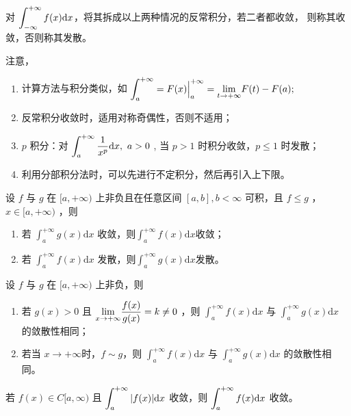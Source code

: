 对 $ \displaystyle \int_{-\infty}^{+\infty}f(x)\mathrm{d}x $，将其拆成以上两种情况的反常积分，若二者都收敛，
则称其收敛，否则称其发散。

注意，
\begin{enumerate}
    \item 计算方法与积分类似，如 $\displaystyle \int_a^{+\infty} = F(x)\Big|^{+\infty}_a = 
    {\displaystyle\lim_{t\rightarrow +\infty}}F(t) - F(a); $ 
    \item 反常积分收敛时，适用对称奇偶性，否则不适用；
    \item $ p $ 积分：对 $ \displaystyle \int_a^{+\infty}\dfrac{1}{x^p}\mathrm{d}x,\ a>0 $ ,
    当 $ p > 1 $ 时积分收敛，$ p\leq 1 $ 时发散；
    \item 利用分部积分法时，可以先进行不定积分，然后再引入上下限。
\end{enumerate}

\begin{Theo}[比较判别法]

    设 $ f $ 与 $ g $ 在 $ [a,+\infty) $ 上非负且在任意区间 $ [a,b],b<\infty $ 可积，且 $ f \leq g $ ，
    $ x\in[a,+\infty) $ ，则\begin{enumerate}
        \item 若 $ \int_a^{+\infty}g(x)\mathrm{d}x $ 收敛，则$ \int_a^{+\infty}f(x)\mathrm{d}x $收敛；
        \item 若 $ \int_a^{+\infty}f(x)\mathrm{d}x $ 发散，则$ \int_a^{+\infty}g(x)\mathrm{d}x $发散。
    \end{enumerate}
\end{Theo}

\begin{Theo}[比较判别法]

    设 $ f $ 与 $ g $ 在 $ [a,+\infty) $ 上非负，则
    \begin{enumerate}
        \item 若 $ g(x) > 0 $ 且 $ \displaystyle {\displaystyle\lim_{x\rightarrow +\infty}}
        \dfrac{f(x)}{g(x)} = k \neq 0 $ ，则 $ \int_a^{+\infty}f(x)\mathrm{d}x $ 与
        $ \int_a^{+\infty}g(x)\mathrm{d}x $ 的敛散性相同；
        \item 若当 $ x\rightarrow+\infty $时，$ f\sim g $，则 $ \int_a^{+\infty}f(x)\mathrm{d}x $ 与
        $ \int_a^{+\infty}g(x)\mathrm{d}x $ 的敛散性相同。
    \end{enumerate}
\end{Theo}

\begin{Theo}[绝对收敛必收敛]

    若 $ f(x) \in C[a,\infty) $ 且 $ \displaystyle \int_a^{+\infty}|f(x)|\mathrm{d}x $ 收敛，则
    $ \displaystyle \int_a^{+\infty}f(x)\mathrm{d}x $ 收敛。
\end{Theo}

